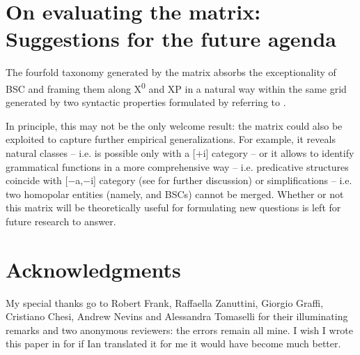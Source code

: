 \documentclass[output=paper]{langsci/langscibook}
\begin{document}
\section{On evaluating the matrix: Suggestions for the future agenda}

The fourfold taxonomy generated by the matrix absorbs the exceptionality of \gls{BSC}
and  framing them along X\textsuperscript{0} and XP in a natural way
within the same grid generated by two syntactic properties formulated by
referring to .

In principle, this may not be the only welcome result: the matrix could also be
exploited to capture further empirical generalizations. For example, it reveals
natural classes – i.e.  is possible only with a [$+$i] category – or it
allows to identify grammatical functions in a more comprehensive way – i.e.
predicative structures coincide with [$-$a,$-$i] category (see
\citealt{Moro2000,Moro2004} for further discussion) or simplifications – i.e.
two homopolar entities (namely,  and \glspl{BSC}) cannot be
merged. Whether or not this matrix will be theoretically useful for formulating
new questions is left for future research to answer.

\printchapterglossary{}

\section*{Acknowledgments}

My special thanks go to Robert Frank, Raffaella Zanuttini, Giorgio Graffi,
Cristiano Chesi, Andrew Nevins and Alessandra Tomaselli for their illuminating
remarks and two anonymous reviewers: the errors remain all mine. I wish I wrote
this paper in  for if Ian translated it for me it would have become much
better.\largerpage

{\sloppy\printbibliography[heading=subbibliography,notkeyword=this]}
\end{document}
